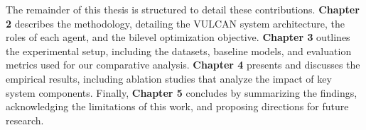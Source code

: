 The remainder of this thesis is structured to detail these contributions. \textbf{Chapter 2} describes the methodology, detailing the VULCAN system architecture, the roles of each agent, and the bilevel optimization objective. \textbf{Chapter 3} outlines the experimental setup, including the datasets, baseline models, and evaluation metrics used for our comparative analysis. \textbf{Chapter 4} presents and discusses the empirical results, including ablation studies that analyze the impact of key system components. Finally, \textbf{Chapter 5} concludes by summarizing the findings, acknowledging the limitations of this work, and proposing directions for future research.
